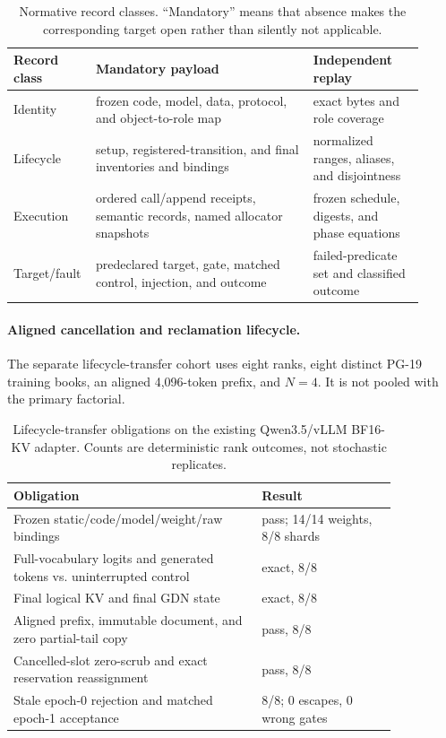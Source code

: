 \documentclass{article}
\begin{document}
\begin{table}[H]
  \caption{Normative record classes.  ``Mandatory'' means that absence makes
  the corresponding target open rather than silently not applicable.}
  \label{tab:normative-records}
  \centering\footnotesize
  \begin{tabular}{@{}p{0.14\linewidth}p{0.51\linewidth}p{0.26\linewidth}@{}}
    \toprule
    Record class & Mandatory payload & Independent replay \tabularnewline
    \midrule
    Identity & frozen code, model, data, protocol, and object-to-role map & exact bytes and role coverage \\
    Lifecycle & setup, registered-transition, and final inventories and bindings & normalized ranges, aliases, and disjointness \\
    Execution & ordered call/append receipts, semantic records, named allocator snapshots & frozen schedule, digests, and phase equations \\
    Target/fault & predeclared target, gate, matched control, injection, and outcome & failed-predicate set and classified outcome \\
    \bottomrule
  \end{tabular}
\end{table}

\paragraph{Aligned cancellation and reclamation lifecycle.}
The separate lifecycle-transfer cohort uses eight ranks, eight distinct PG-19
training books, an aligned 4,096-token prefix, and $N=4$.  It is not pooled
with the primary factorial.

\begin{table}[H]
\caption{Lifecycle-transfer obligations on the existing Qwen3.5/vLLM BF16-KV
adapter.  Counts are deterministic rank outcomes, not stochastic replicates.}
\label{tab:lifecycle-transfer}
\centering\small
\begin{tabular}{@{}p{0.55\linewidth}p{0.30\linewidth}@{}}
\toprule
Obligation & Result \\
\midrule
Frozen static/code/model/weight/raw bindings & pass; 14/14 weights, 8/8 shards \\
Full-vocabulary logits and generated tokens vs. uninterrupted control & exact, 8/8 \\
Final logical KV and final GDN state & exact, 8/8 \\
Aligned prefix, immutable document, and zero partial-tail copy & pass, 8/8 \\
Cancelled-slot zero-scrub and exact reservation reassignment & pass, 8/8 \\
Stale epoch-0 rejection and matched epoch-1 acceptance & 8/8; 0 escapes, 0 wrong gates \\
\bottomrule
\end{tabular}
\end{table}
\end{document}
